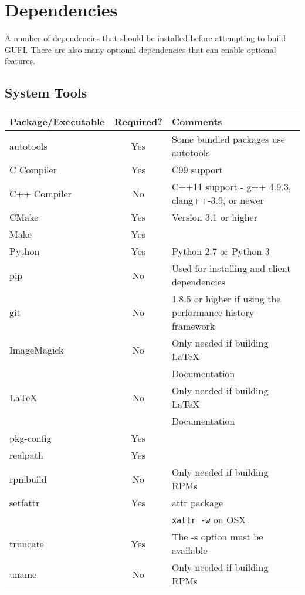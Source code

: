 \section{Dependencies}
A number of dependencies that should be installed before attempting to
build GUFI. There are also many optional dependencies that can enable
optional features.

\subsection{System Tools}
\begin{tabularx}{\textwidth}{| l | c | X | }
  \hline
  Package/Executable & Required? & Comments \\
  \hline
  autotools & Yes & Some bundled packages use autotools \\
  \hline
  C Compiler & Yes & C99 support \\
  \hline
  C++ Compiler & No & C++11 support - g++ 4.9.3, clang++-3.9, or newer
  \hfill \\
  \hline
  CMake & Yes & Version 3.1 or higher \\
  \hline
  Make & Yes & \\
  \hline
  Python & Yes & Python 2.7 or Python 3 \\
  \hline
  pip & No & Used for installing and client dependencies \\
  \hline
  git & No & 1.8.5 or higher if using the performance history
  framework \\
  \hline
  ImageMagick & No & Only needed if building \LaTeX \hfill \\
  & & Documentation \hfill \\
  \hline
  \LaTeX & No & Only needed if building \LaTeX \hfill \\
  & & Documentation \hfill \\
  \hline
  pkg-config & Yes & \\
  \hline
  realpath & Yes & \\
  \hline
  rpmbuild & No & Only needed if building RPMs \\
  \hline
  setfattr & Yes & attr package \\
  & & \texttt{xattr -w} on OSX \\
  \hline
  truncate & Yes & The -s option must be available \\
  \hline
  uname & No & Only needed if building RPMs \\
  \hline
\end{tabularx}

